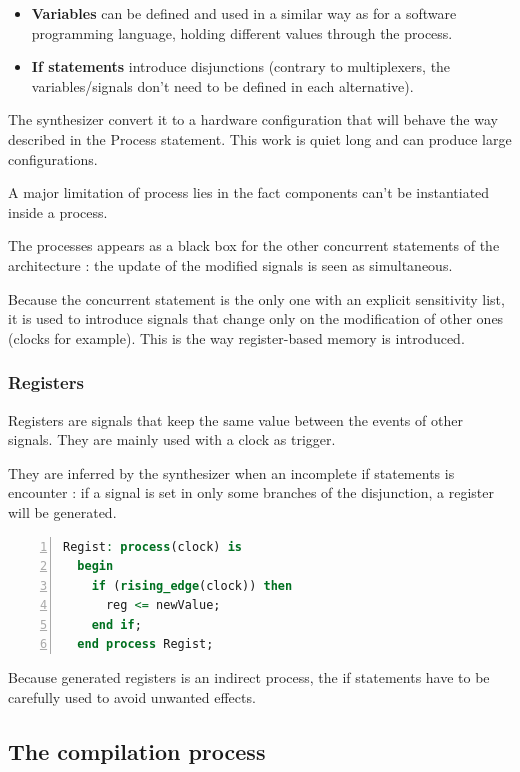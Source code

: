 \documentclass[10pt,a4paper]{article}
\begin{document}
\begin{itemize}
	\item \textbf{Variables} can be defined and used in a similar way as for a software programming language, holding different values through the process.
	\item \textbf{If statements} introduce disjunctions (contrary to multiplexers, the variables/signals don't need to be defined in each alternative).
\end{itemize}

The synthesizer convert it to a hardware configuration that will behave the way described in the Process statement. This work is quiet long and can produce large configurations.


A major limitation of process lies in the fact components can't be instantiated inside a process.

The processes appears as a black box for the other concurrent statements of the architecture : the update of the modified signals is seen as simultaneous.

Because the concurrent statement is the only one with an explicit sensitivity list, it is used to introduce signals that change only on the modification of other ones (clocks for example). This is the way register-based memory is introduced.

\subsubsection{Registers}

Registers are signals that keep the same value between the events of other signals. They are mainly used with a clock as trigger.

They are inferred by the synthesizer when an incomplete if statements is encounter : if a signal is set in only some branches of the disjunction, a register will be generated.



\begin{lstlisting}[language=VHDL, frame=single, numbers=left, title=Example of register generation]
  Regist: process(clock) is
  begin
    if (rising_edge(clock)) then
      reg <= newValue;
    end if;
  end process Regist;
\end{lstlisting}


Because generated registers is an indirect process, the if statements have to be carefully used to avoid unwanted effects.

\subsection{The compilation process}
\end{document}
